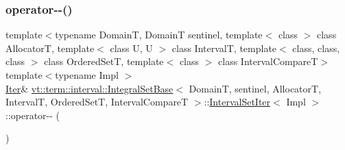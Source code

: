 \subsubsection{\texorpdfstring{operator-\/-\/()}{operator--()}\hspace{0.1cm}{\footnotesize\ttfamily [1/2]}}
{\footnotesize\ttfamily template$<$typename DomainT, DomainT sentinel, template$<$ class $>$ class AllocatorT, template$<$ class U, U $>$ class IntervalT, template$<$ class, class, class $>$ class Ordered\+SetT, template$<$ class $>$ class Interval\+CompareT$>$ \\
template$<$typename Impl $>$ \\
\hyperlink{structvt_1_1term_1_1interval_1_1_integral_set_base_1_1_interval_set_iter_a4056b2dcca9f60143d2d76387599e6e1}{Iter}\& \hyperlink{structvt_1_1term_1_1interval_1_1_integral_set_base}{vt\+::term\+::interval\+::\+Integral\+Set\+Base}$<$ DomainT, sentinel, AllocatorT, IntervalT, Ordered\+SetT, Interval\+CompareT $>$\+::\hyperlink{structvt_1_1term_1_1interval_1_1_integral_set_base_1_1_interval_set_iter}{Interval\+Set\+Iter}$<$ Impl $>$\+::operator-\/-\/ (\begin{DoxyParamCaption}{ }\end{DoxyParamCaption})\hspace{0.3cm}{\ttfamily [inline]}}

\mbox{\label{structvt_1_1term_1_1interval_1_1_integral_set_base_1_1_interval_set_iter_a90d803834d8cdbc8b568d91123a2e307}} 
